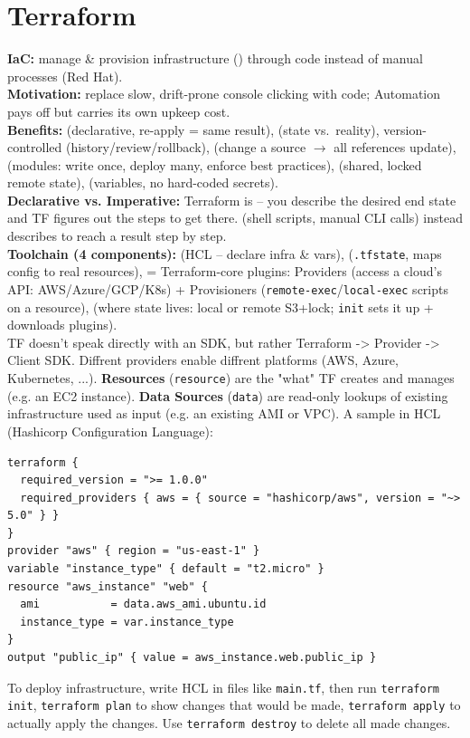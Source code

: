 \section{Terraform}
\textbf{IaC:} manage \& provision infrastructure () through code instead of manual processes (Red Hat). \\
\textbf{Motivation:} replace slow, drift-prone  console clicking with code; Automation pays off but carries its own upkeep cost. \\
\textbf{Benefits:}  (declarative, re-apply = same result),  (state vs.\ reality), version-controlled (history/review/rollback),  (change a source $\to$ all references update),  (modules: write once, deploy many, enforce best practices),  (shared, locked remote state),  (variables, no hard-coded secrets). \\
\textbf{Declarative vs. Imperative:} Terraform is  -- you describe the desired end state and TF figures out the steps to get there.  (shell scripts, manual CLI calls) instead describes  to reach a result step by step. \\
\textbf{Toolchain (4 components):}  (HCL -- declare infra \& vars),  (\texttt{.tfstate}, maps config to real resources),  = Terraform-core plugins: Providers (access a cloud's API: AWS/Azure/GCP/K8s) + Provisioners (\texttt{remote-exec}/\texttt{local-exec} scripts on a resource),  (where state lives: local or remote S3+lock; \texttt{init} sets it up + downloads plugins). \\
TF doesn't speak directly with an SDK, but rather Terraform -> Provider -> Client SDK. Diffrent providers enable diffrent platforms (AWS, Azure, Kubernetes, ...). \textbf{Resources} (\texttt{resource}) are the "what" TF creates and manages (e.g. an EC2 instance). \textbf{Data Sources} (\texttt{data}) are read-only lookups of existing infrastructure used as input (e.g. an existing AMI or VPC). A sample in HCL (Hashicorp Configuration Language):
\begin{lstlisting}[language=hcl]
terraform {
  required_version = ">= 1.0.0"
  required_providers { aws = { source = "hashicorp/aws", version = "~> 5.0" } }
}
provider "aws" { region = "us-east-1" }
variable "instance_type" { default = "t2.micro" }
resource "aws_instance" "web" {
  ami           = data.aws_ami.ubuntu.id
  instance_type = var.instance_type
}
output "public_ip" { value = aws_instance.web.public_ip }
\end{lstlisting}
To deploy infrastructure, write HCL in files like \texttt{main.tf}, then run \texttt{terraform init}, \texttt{terraform plan} to show changes that would be made, \texttt{terraform apply} to actually apply the changes. Use \texttt{terraform destroy} to delete all made changes.
